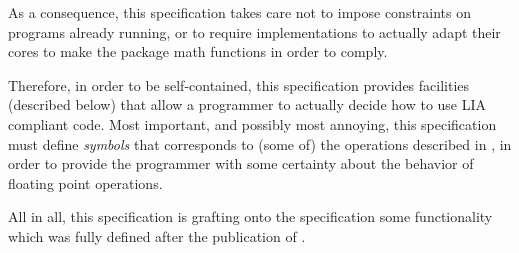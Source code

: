 \documentclass[../Introduction.tex]{subfiles}
\begin{document}
As a consequence, this specification takes care not to impose
constraints on programs already running, or to require implementations to
actually adapt their cores to make the \CL{} package math functions in
order to comply.

Therefore, in order to be self-contained, this specification provides
facilities (described below) that allow a \CL{} programmer to actually
decide how to use LIA compliant code.  Most important, and
possibly most annoying, this specification must define \emph{symbols}
that corresponds to (some of) the operations described in
\cite{2008:IEEE-754}, in order to provide the programmer with some
certainty about the behavior of floating point operations.

All in all, this specification is grafting onto the \CL{}
specification some functionality which was fully defined after the
publication of \cite{1996:ANSIHyperSpec}.
\end{document}
